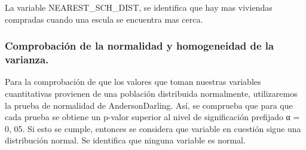 \documentclass[
]{article}
\newenvironment{Shaded}{\begin{snugshade}}{\end{snugshade}}
\newcommand{\CommentTok}[1]{\textcolor[rgb]{0.56,0.35,0.01}{\textit{#1}}}
\newcommand{\ControlFlowTok}[1]{\textcolor[rgb]{0.13,0.29,0.53}{\textbf{#1}}}
\newcommand{\DecValTok}[1]{\textcolor[rgb]{0.00,0.00,0.81}{#1}}
\newcommand{\FloatTok}[1]{\textcolor[rgb]{0.00,0.00,0.81}{#1}}
\newcommand{\FunctionTok}[1]{\textcolor[rgb]{0.00,0.00,0.00}{#1}}
\newcommand{\NormalTok}[1]{#1}
\newcommand{\OtherTok}[1]{\textcolor[rgb]{0.56,0.35,0.01}{#1}}
\newcommand{\SpecialCharTok}[1]{\textcolor[rgb]{0.00,0.00,0.00}{#1}}
\newcommand{\StringTok}[1]{\textcolor[rgb]{0.31,0.60,0.02}{#1}}
\begin{document}
La variable NEAREST\_SCH\_DIST, se identifica que hay mas viviendas
compradas cuando una escula se encuentra mas cerca.

\hypertarget{comprobaciuxf3n-de-la-normalidad-y-homogeneidad-de-la-varianza.}{%
\subsubsection{Comprobación de la normalidad y homogeneidad de la
varianza.}\label{comprobaciuxf3n-de-la-normalidad-y-homogeneidad-de-la-varianza.}}

Para la comprobación de que los valores que toman nuestras variables
cuantitativas provienen de una población distribuida normalmente,
utilizaremos la prueba de normalidad de AndersonDarling. Así, se
comprueba que para que cada prueba se obtiene un p-valor superior al
nivel de significación prefijado α = 0, 05. Si esto se cumple, entonces
se considera que variable en cuestión sigue una distribución normal. Se
identifica que ninguna variable es normal.

\begin{Shaded}
\end{Shaded}
\end{document}
